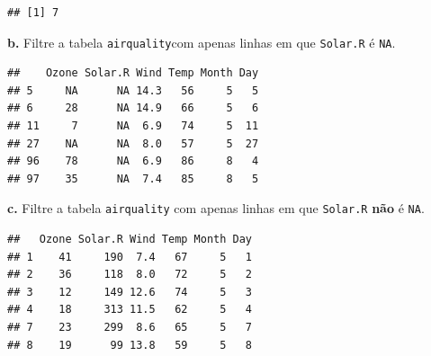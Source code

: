 \documentclass[
]{book}
\newenvironment{Shaded}{\begin{snugshade}}{\end{snugshade}}
\newcommand{\CommentTok}[1]{\textcolor[rgb]{0.56,0.35,0.01}{\textit{#1}}}
\newcommand{\FunctionTok}[1]{\textcolor[rgb]{0.00,0.00,0.00}{#1}}
\newcommand{\NormalTok}[1]{#1}
\newcommand{\OtherTok}[1]{\textcolor[rgb]{0.56,0.35,0.01}{#1}}
\newcommand{\SpecialCharTok}[1]{\textcolor[rgb]{0.00,0.00,0.00}{#1}}
\begin{document}
\begin{Shaded}
\end{Shaded}

\begin{verbatim}
## [1] 7
\end{verbatim}

\textbf{b.} Filtre a tabela \texttt{airquality}com apenas linhas em que \texttt{Solar.R} é \texttt{NA}.

\begin{Shaded}
\end{Shaded}

\begin{verbatim}
##    Ozone Solar.R Wind Temp Month Day
## 5     NA      NA 14.3   56     5   5
## 6     28      NA 14.9   66     5   6
## 11     7      NA  6.9   74     5  11
## 27    NA      NA  8.0   57     5  27
## 96    78      NA  6.9   86     8   4
## 97    35      NA  7.4   85     8   5
\end{verbatim}

\textbf{c.} Filtre a tabela \texttt{airquality} com apenas linhas em que \texttt{Solar.R} \textbf{não} é \texttt{NA}.

\begin{Shaded}
\end{Shaded}

\begin{verbatim}
##   Ozone Solar.R Wind Temp Month Day
## 1    41     190  7.4   67     5   1
## 2    36     118  8.0   72     5   2
## 3    12     149 12.6   74     5   3
## 4    18     313 11.5   62     5   4
## 7    23     299  8.6   65     5   7
## 8    19      99 13.8   59     5   8
\end{verbatim}
\end{document}
